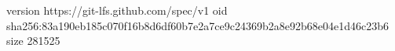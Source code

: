 version https://git-lfs.github.com/spec/v1
oid sha256:83a190eb185c070f16b8d6df60b7e2a7ce9c24369b2a8e92b68e04e1d46c23b6
size 281525
